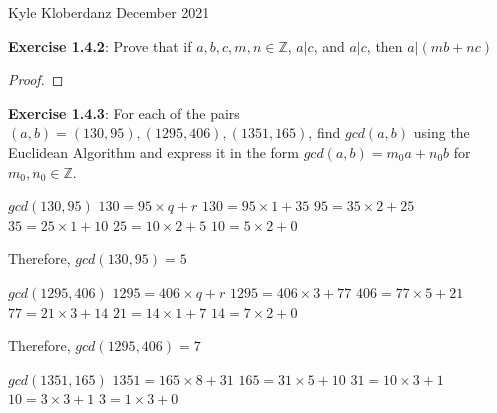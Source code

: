 \documentclass[a4paper]{article}
\begin{document}
\begin{myparindent}{0pt}

Kyle Kloberdanz  December 2021 \newline

\textbf{Exercise 1.4.2}:
Prove that if $a, b, c, m, n \in \mathbb{Z}$, $a|c$, and $a|c$, then $a|(mb + nc)$
\begin{proof}
\end{proof}

\textbf{Exercise 1.4.3}:
For each of the pairs $(a, b) = (130, 95), (1295, 406), (1351, 165)$, find $gcd(a, b)$
using the Euclidean Algorithm and express it in the form $gcd(a, b) = m_0 a + n_0 b$
for $m_0, n_0 \in \mathbb{Z}$. \newline

$gcd(130, 95)$ \newline
$130 = 95 \times q + r$ \newline
$130 = 95 \times 1 + 35$ \newline
$95 = 35 \times 2 + 25$ \newline
$35 = 25 \times 1 + 10$ \newline
$25 = 10 \times 2 + 5$ \newline
$10 = 5 \times 2 + 0$ \newline

Therefore, $gcd(130, 95) = 5$ \newline

$gcd(1295, 406)$ \newline
$1295 = 406 \times q + r$ \newline
$1295 = 406 \times 3 + 77$ \newline
$406 = 77 \times 5 + 21$ \newline
$77 = 21 \times 3 + 14$ \newline
$21 = 14 \times 1 + 7$ \newline
$14 = 7 \times 2 + 0$ \newline

Therefore, $gcd(1295, 406) = 7$ \newline

$gcd(1351, 165)$ \newline
$1351 = 165 \times 8 + 31$ \newline
$165 = 31 \times 5 + 10$ \newline
$31 = 10 \times 3 + 1$ \newline
$10 = 3 \times 3 + 1$ \newline
$3 = 1 \times 3 + 0$ \newline


\end{myparindent}
\end{document}
